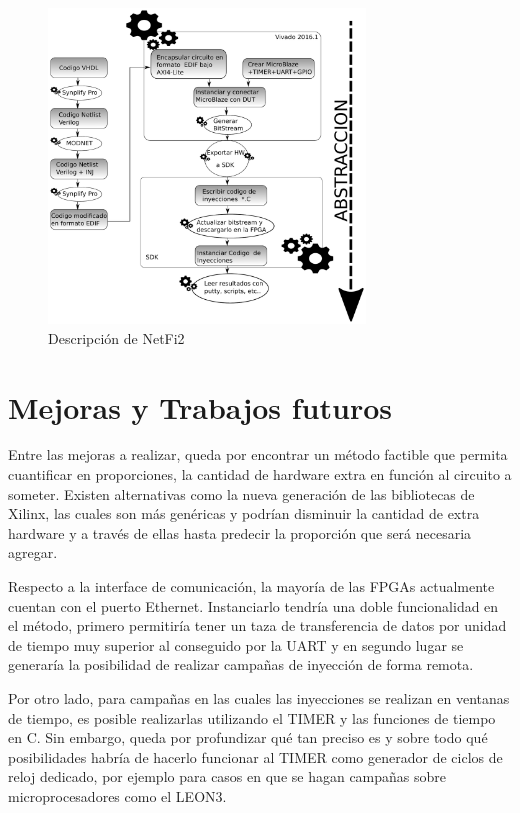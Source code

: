 \documentclass[a4paper,openright,12pt]{report}
\begin{document}
\begin{figure}[H]
	\centering
	\includegraphics[width=0.75\textwidth]{img/Abstraccion.pdf}
	\caption{Descripción de NetFi2 }
	\label{proceso3}
    \end{figure}



\section{Mejoras y Trabajos futuros }


Entre las mejoras a realizar, queda por encontrar un método factible que permita cuantificar en proporciones, la cantidad de hardware extra en función al circuito a someter.
Existen alternativas como la nueva generación de las bibliotecas de Xilinx, las cuales son más genéricas y podrían disminuir la cantidad de extra hardware y  a través de ellas hasta predecir la proporción  que será necesaria agregar.

Respecto a la interface de comunicación, la mayoría de las FPGAs actualmente cuentan con el puerto Ethernet.  Instanciarlo tendría una doble funcionalidad en el método, primero permitiría tener un taza de transferencia  de datos por unidad de tiempo muy superior al conseguido por la UART y en segundo lugar se generaría la posibilidad de realizar campañas de inyección de forma remota.

Por otro lado, para campañas en las cuales las inyecciones se realizan en ventanas de tiempo, es posible realizarlas utilizando el TIMER y las funciones de tiempo en C. Sin embargo, queda por profundizar qué tan preciso es y sobre todo qué posibilidades habría de hacerlo funcionar al TIMER como generador de ciclos de reloj dedicado, por ejemplo para  casos en que se hagan campañas sobre microprocesadores como el LEON3. 
\end{document}
